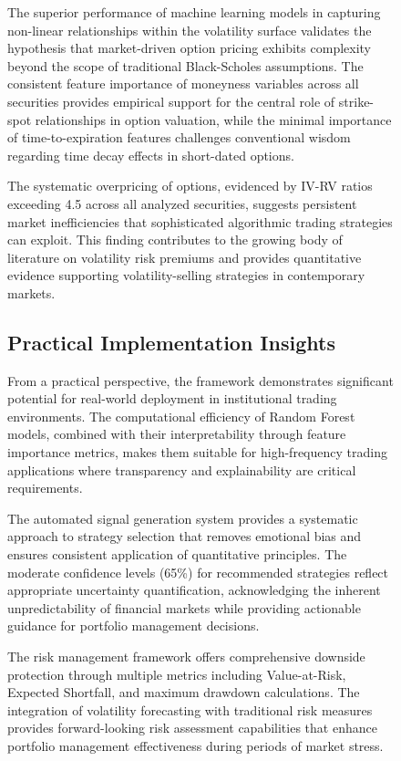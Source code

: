 \documentclass[12pt,a4paper]{article}
\begin{document}
\begin{figure}[H]
The superior performance of machine learning models in capturing non-linear relationships within the volatility surface validates the hypothesis that market-driven option pricing exhibits complexity beyond the scope of traditional Black-Scholes assumptions. The consistent feature importance of moneyness variables across all securities provides empirical support for the central role of strike-spot relationships in option valuation, while the minimal importance of time-to-expiration features challenges conventional wisdom regarding time decay effects in short-dated options.

The systematic overpricing of options, evidenced by IV-RV ratios exceeding 4.5 across all analyzed securities, suggests persistent market inefficiencies that sophisticated algorithmic trading strategies can exploit. This finding contributes to the growing body of literature on volatility risk premiums and provides quantitative evidence supporting volatility-selling strategies in contemporary markets.

\subsection{Practical Implementation Insights}

From a practical perspective, the framework demonstrates significant potential for real-world deployment in institutional trading environments. The computational efficiency of Random Forest models, combined with their interpretability through feature importance metrics, makes them suitable for high-frequency trading applications where transparency and explainability are critical requirements.

The automated signal generation system provides a systematic approach to strategy selection that removes emotional bias and ensures consistent application of quantitative principles. The moderate confidence levels (65\%) for recommended strategies reflect appropriate uncertainty quantification, acknowledging the inherent unpredictability of financial markets while providing actionable guidance for portfolio management decisions.

The risk management framework offers comprehensive downside protection through multiple metrics including Value-at-Risk, Expected Shortfall, and maximum drawdown calculations. The integration of volatility forecasting with traditional risk measures provides forward-looking risk assessment capabilities that enhance portfolio management effectiveness during periods of market stress.


\end{figure}
\end{document}
